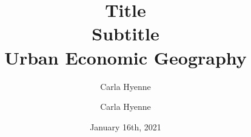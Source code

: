 \documentclass{article}
\title{Title
\\[5ex]Subtitle \\[3ex]}
\author{Carla Hyenne}
\date{January 16th, 2021}
\title{Urban Economic Geography}
\author{Carla Hyenne}
\begin{document}
\maketitle

\tableofcontents

\pagebreak
\end{document}
